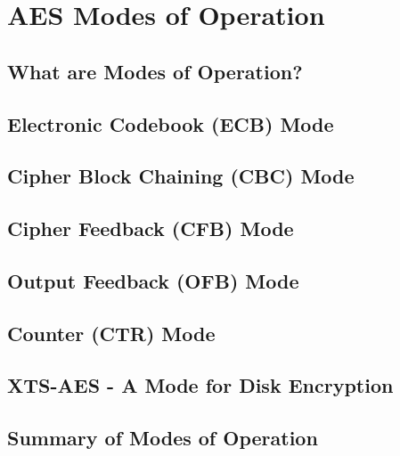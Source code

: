 \section{AES Modes of Operation}

\subsection{What are Modes of Operation?}

\subsection{Electronic Codebook (ECB) Mode}

\subsection{Cipher Block Chaining (CBC) Mode}

\subsection{Cipher Feedback (CFB) Mode}

\subsection{Output Feedback (OFB) Mode}

\subsection{Counter (CTR) Mode}

\subsection{XTS-AES - A Mode for Disk Encryption}

\subsection{Summary of Modes of Operation}
